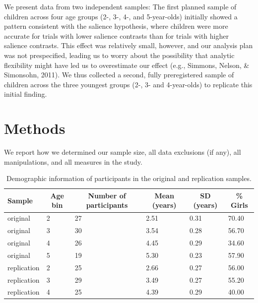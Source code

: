 \documentclass[man]{apa6}
\theoremstyle{definition}
\theoremstyle{definition}
\theoremstyle{definition}
\theoremstyle{remark}
\begin{document}
We present data from two independent samples: The first planned sample
of children across four age groups (2-, 3-, 4-, and 5-year-olds)
initially showed a pattern consistent with the salience hypothesis,
where children were more accurate for trials with lower salience
contrasts than for trials with higher salience contrasts. This effect
was relatively small, however, and our analysis plan was not
prespecified, leading us to worry about the possibility that analytic
flexibility might have led us to overestimate our effect (e.g., Simmons,
Nelson, \& Simonsohn, 2011). We thus collected a second, fully
preregistered sample of children across the three youngest groups (2-,
3- and 4-year-olds) to replicate this initial finding.

\section{Methods}\label{methods}

We report how we determined our sample size, all data exclusions (if
any), all manipulations, and all measures in the study.

\begin{table}[tbp]
\begin{center}
\begin{threeparttable}
\caption{\label{tab:participantsummarytab}Demographic information of participants in the original and replication samples.}
\begin{tabular}{llllll}
\toprule
Sample & \multicolumn{1}{c}{Age bin} & \multicolumn{1}{c}{Number of participants} & \multicolumn{1}{c}{Mean (years)} & \multicolumn{1}{c}{SD (years)} & \multicolumn{1}{c}{\% Girls}\\
\midrule
original & 2 & 27 & 2.51 & 0.31 & 70.40\\
original & 3 & 30 & 3.54 & 0.28 & 56.70\\
original & 4 & 26 & 4.45 & 0.29 & 34.60\\
original & 5 & 19 & 5.30 & 0.23 & 57.90\\
replication & 2 & 25 & 2.66 & 0.27 & 56.00\\
replication & 3 & 29 & 3.49 & 0.27 & 55.20\\
replication & 4 & 25 & 4.39 & 0.29 & 40.00\\
\bottomrule
\end{tabular}
\end{threeparttable}
\end{center}
\end{table}
\end{document}

